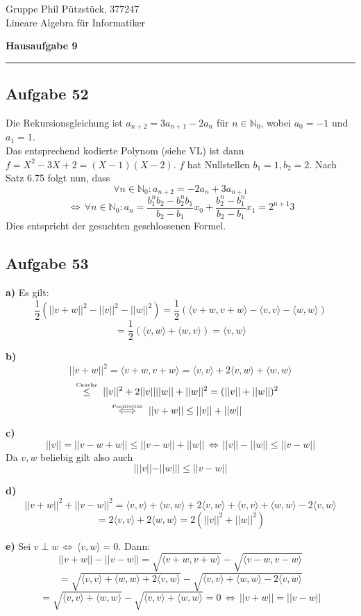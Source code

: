 \documentclass[a4paper,graphics,11pt]{article}
\newcommand{\aufgabe}[1]{\subsection*{Aufgabe #1}}
\newcommand{\up}[2]{\mathrel{\overset{\makebox[0pt]{\mbox{\normalfont\tiny #2}}}{#1}}}
\begin{document}
\noindent Gruppe              \hfill Phil Pützstück, 377247\\
\noindent Lineare Algebra für Informatiker\\
\begin{center}
	\LARGE{\textbf{Hausaufgabe 9}}
\end{center}
\begin{center}
\rule[0.1ex]{\textwidth}{1pt}
\end{center}



\aufgabe{52}
Die Rekursionsgleichung ist $a_{n+2} = 3a_{n+1} - 2a_n$ für $n \in \mathbb{N}_0$,
wobei $a_0 = -1$ und $a_1 = 1$.\\
Das entsprechend kodierte Polynom (siehe VL) ist dann $f = X^2-3X+2 = (X-1)(X-2)$.
$f$ hat Nullstellen $b_1 = 1, b_2 = 2$. Nach Satz 6.75 folgt nun, dass
$$
    \forall n \in \mathbb{N}_0 : a_{n+2} = -2a_n+3a_{n+1}
$$$$
    \,\Longleftrightarrow\,
    \forall n \in \mathbb{N}_0 : a_n = \frac{b_1^nb_2-b_2^nb_1}{b_2-b_1}x_0 + \frac{b_2^n-b_1^n}{b_2-b_1}x_1
    = 2^{n+1}3
$$
Dies entspricht der gesuchten geschlossenen Formel.

\aufgabe{53}

\textbf{a)}
Es gilt:
$$
    \frac{1}{2}(||v+w||^2 - ||v||^2-||w||^2)
    = \frac{1}{2}(\langle v+w, v+w \rangle - \langle v,v\rangle - \langle w,w \rangle)
$$$$
    = \frac{1}{2}(\langle v, w \rangle + \langle w,v \rangle)
    = \langle v,w \rangle
$$

\textbf{b)}
$$
    ||v+w||^2
    = \langle v+w , v+w \rangle
    = \langle v,v\rangle + 2\langle v,w\rangle + \langle w,w \rangle
$$$$
    \up{\leq}{Cauchy}\quad ||v||^2 + 2||v||||w|| + ||w||^2 = (||v|| + ||w||)^2
$$$$
    \up{\Longleftrightarrow}{Positivität}\quad ||v+w|| \leq ||v|| + ||w||
$$

\textbf{c)}
$$
    ||v|| = ||v - w + w|| \leq ||v - w|| + ||w||
    \,\Longleftrightarrow\,
    ||v|| - ||w|| \leq ||v-w||
$$
Da $v,w$ beliebig gilt also auch
$$
    | ||v|| - ||w|| | \leq ||v-w||
$$

\textbf{d)}
$$
    ||v+w||^2 + ||v-w||^2
    = \langle v,v \rangle + \langle w,w \rangle + 2\langle v,w\rangle
        + \langle v,v \rangle + \langle w,w \rangle - 2 \langle v,w \rangle
$$$$
    = 2\langle v,v \rangle + 2 \langle w,w \rangle
    = 2(||v||^2 + ||w||^2)
$$

\newpage

\textbf{e)}
Sei $v \perp w \,\Longleftrightarrow\, \langle v,w \rangle = 0$. Dann:
$$
    ||v+w|| - ||v-w||
    = \sqrt{\langle v+w, v+w\rangle} - \sqrt{\langle v-w, v-w \rangle}
$$$$
    = \sqrt{\langle v,v \rangle + \langle w,w \rangle + 2\langle v,w \rangle} -
        \sqrt{\langle v,v \rangle + \langle w,w \rangle - 2 \langle v,w \rangle}
$$$$
    = \sqrt{\langle v,v \rangle + \langle w,w \rangle} -
        \sqrt{\langle v,v \rangle + \langle w,w \rangle}
    = 0
    \,\Longleftrightarrow\, ||v+w|| = ||v-w||
$$
\end{document}
